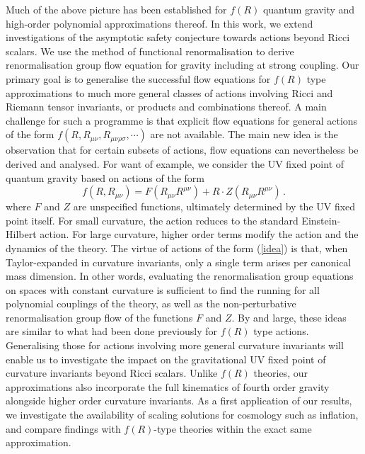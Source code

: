 \documentclass[notitlepage,eqsecnum,bm,amsmath,preprintnumbers,superscriptaddress,nofootinbib,aps,11pt]{revtex4-1}
\def\eq#1{(\ref{#1})}
\def\beq{\begin{equation}}
\def\eeq{\end{equation}}
\begin{document}
Much of the above picture has been established  for $f(R)$ quantum gravity and high-order polynomial approximations thereof. In this work, we extend investigations of the asymptotic safety conjecture towards actions beyond Ricci scalars. We use the method of functional renormalisation to derive renormalisation group flow equation for gravity including at strong coupling.
Our primary goal is to generalise the successful flow equations for $f(R)$ type approximations to much more general classes of actions involving Ricci and Riemann tensor invariants, or products and combinations thereof.  A main challenge for such a  programme is that explicit flow equations for general actions of the form $f(R,R_{\mu\nu},R_{\mu\nu\rho\sigma},\cdots)$ are not available. The main new idea is the observation that for certain subsets of actions, flow equations can nevertheless be derived and analysed. For want of example, we consider the UV fixed point of quantum gravity based on actions of the form
\beq\label{idea}
f(R,R_{\mu\nu})=F(R_{\mu\nu}R^{\mu\nu})+R\cdot Z(R_{\mu\nu}R^{\mu\nu})\,.
\eeq
where $F$ and $Z$ are unspecified functions, ultimately determined by the UV fixed point itself. 
For small curvature, the action reduces to the standard Einstein-Hilbert action. For large curvature, higher order terms modify the action and the dynamics of the theory. The virtue of actions of the form \eq{idea} is that, when Taylor-expanded in curvature invariants, only a single term arises per canonical mass dimension. In other words, evaluating the renormalisation group equations on spaces with constant curvature is  sufficient to find the running for all polynomial couplings of the theory, as well as the  non-perturbative renormalisation group  flow of the functions $F$ and $Z$. By and large, these ideas are similar to what had been done previously for $f(R)$ type actions. Generalising those for actions involving more general curvature invariants will enable us to investigate the impact on the gravitational UV fixed point of curvature invariants beyond Ricci scalars. Unlike $f(R)$ theories, 
our approximations  also incorporate the full kinematics of fourth order gravity alongside higher order curvature invariants. As a first application of our results, we investigate the availability of scaling solutions for cosmology such as inflation, and compare findings with $f(R)$-type theories within the exact same approximation.\\ 
\end{document}
